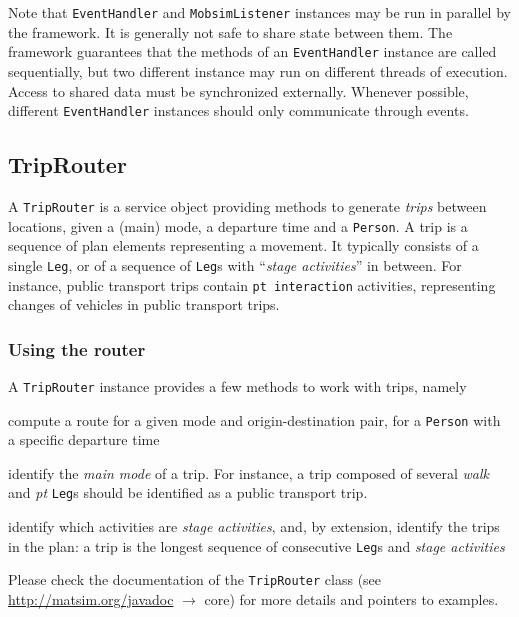 Note that \lstinline|EventHandler| and \lstinline|MobsimListener| instances may be run in parallel by
the framework. It is generally not safe to share state between them. The framework guarantees that 
the methods of an \lstinline|EventHandler| instance are called sequentially, but two different instance
may run on different threads of execution. Access to shared data must be synchronized externally. Whenever
possible, different \lstinline|EventHandler| instances should only communicate through events.

\subsection{TripRouter}
\label{sec:router-extension-point}

A \lstinline{TripRouter} is a service object providing methods to generate \emph{trips} between locations,
given a (main) mode, a departure time and a \lstinline{Person}.
A trip is a sequence of plan elements representing a movement.
It typically consists of a single \lstinline{Leg},
or of a sequence of \lstinline{Leg}s with ``\emph{stage activities}'' in between.
For instance, public transport trips
contain \lstinline{pt interaction} activities,
representing changes of vehicles in public transport trips.

\subsubsection{Using the router}

A \lstinline{TripRouter} instance provides a few methods to work with trips, namely
\begin{compactitem}
	\item compute a route for a given mode and origin-destination pair, for a \lstinline{Person} with a specific departure time
	\item identify the \emph{main mode} of a trip. For instance, a trip composed of several \emph{walk} and \emph{pt} \lstinline{Leg}s should be identified as a public transport trip.
	\item identify which activities are \emph{stage activities}, and, by extension,
		identify the trips in the plan: a trip is the longest sequence of consecutive
		\lstinline{Leg}s and \emph{stage activities}
\end{compactitem}

Please check the documentation of the \lstinline{TripRouter} class  (see \url{http://matsim.org/javadoc} $\to$ core) for more details and pointers to examples.

